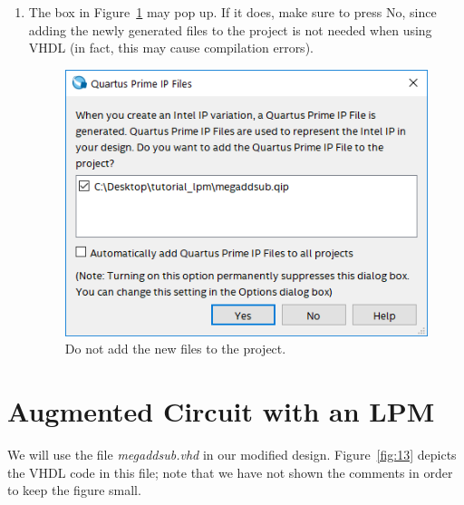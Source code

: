 \documentclass[11pt, twoside, pdftex]{article}
\begin{document}
\begin{enumerate}
\item The box in Figure~\ref{fig:12} may pop up. If it does, make sure to press {\sf No}, since
adding the newly generated files to the project is not needed when using VHDL (in fact,
this may cause compilation errors).

\begin{figure}[H]
   \begin{center}
      \includegraphics[scale=0.50]{figures/figure12.png}
   \caption{Do not add the new files to the project.} 
	 \label{fig:12}
	 \end{center}
\end{figure}  

\end{enumerate}

\section{Augmented Circuit with an LPM}

We will use the file {\it megaddsub.vhd} in our modified design.
Figure~\ref{fig:13} depicts the VHDL code in this file; note that we have not shown 
the comments in order to keep the figure small.


\end{document}

